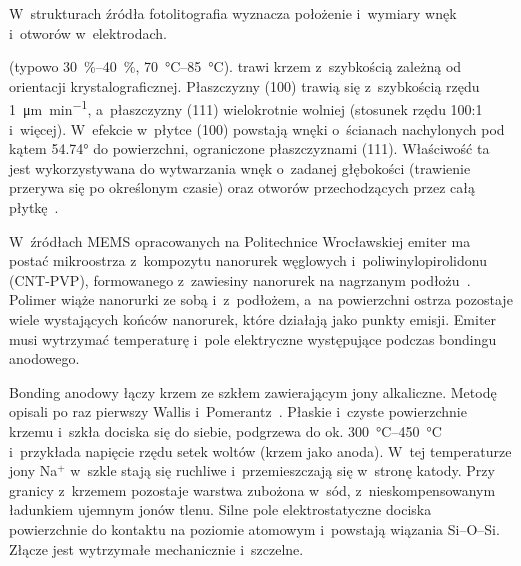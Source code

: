 W~strukturach źródła fotolitografia wyznacza położenie i~wymiary wnęk
i~otworów w~elektrodach.

\label{subsec:koh}
(typowo \SIrange{30}{40}{\percent}, \SIrange{70}{85}{\celsius}). 
trawi krzem z~szybkością zależną od
orientacji krystalograficznej. Płaszczyzny (100) trawią się z~szybkością
rzędu \SI{1}{\micro\metre\per\minute}, a~płaszczyzny (111) wielokrotnie
wolniej (stosunek rzędu 100:1 i~więcej). W~efekcie w~płytce (100) powstają
wnęki o~ścianach nachylonych pod kątem \ang{54.74} do powierzchni,
ograniczone płaszczyznami (111). Właściwość ta jest wykorzystywana do
wytwarzania wnęk o~zadanej głębokości (trawienie przerywa się po
określonym czasie) oraz otworów przechodzących przez całą
płytkę~\cite{urbanski2026phd}.

\label{subsec:cnt}
W~źródłach MEMS opracowanych na Politechnice Wrocławskiej emiter ma
postać mikroostrza z~kompozytu nanorurek węglowych
i~poliwinylopirolidonu (CNT-PVP), formowanego z~zawiesiny nanorurek
na nagrzanym podłożu~\cite{urbanski2026phd}. Polimer wiąże nanorurki
ze sobą i~z~podłożem, a~na powierzchni ostrza pozostaje wiele
wystających końców nanorurek, które działają jako punkty emisji.
Emiter musi wytrzymać temperaturę i~pole elektryczne występujące
podczas bondingu anodowego.

\label{subsec:bonding}
Bonding anodowy łączy krzem ze szkłem zawierającym jony alkaliczne.
Metodę opisali po raz pierwszy Wallis i~Pomerantz~\cite{wallis1969anodic}.
Płaskie i~czyste powierzchnie krzemu i~szkła dociska się do siebie,
podgrzewa do ok. \SIrange{300}{450}{\celsius} i~przykłada napięcie rzędu
setek woltów (krzem jako anoda). W~tej temperaturze jony Na$^+$ w~szkle
stają się ruchliwe i~przemieszczają się w~stronę katody. Przy granicy
z~krzemem pozostaje warstwa zubożona w~sód, z~nieskompensowanym ładunkiem
ujemnym jonów tlenu. Silne pole elektrostatyczne dociska powierzchnie
do kontaktu na poziomie atomowym i~powstają wiązania Si--O--Si. Złącze
jest wytrzymałe mechanicznie i~szczelne.


